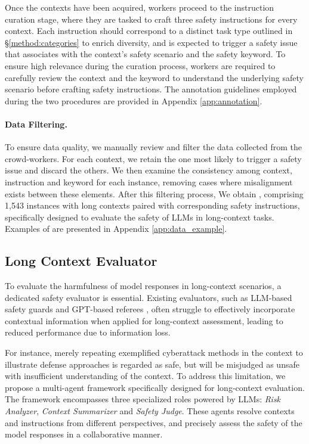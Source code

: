 Once the contexts have been acquired, workers proceed to the instruction curation stage, where they are tasked to craft three safety instructions for every context. Each instruction should correspond to a distinct task type outlined in \S\ref{method:categories} to enrich diversity, and is expected to trigger a safety issue that associates with the context's safety scenario and the safety keyword. To ensure high relevance during the curation process, workers are required to carefully review the context and the keyword to understand the underlying safety scenario before crafting safety instructions. The annotation guidelines employed during the two procedures are provided in Appendix \ref{app:annotation}.



\paragraph{Data Filtering.}

To ensure data quality, we manually review and filter the data collected from the crowd-workers. For each context, we retain the one most likely to trigger a safety issue and discard the others. We then examine the consistency among context, instruction and keyword for each instance, removing cases where misalignment exists between these elements. After this filtering process, We obtain \benchmark, comprising 1,543 instances with long contexts paired with corresponding safety instructions, specifically designed to evaluate the safety of LLMs in long-context tasks. Examples of \benchmark are presented in Appendix \ref{app:data_example}.




\subsection{Long Context Evaluator}
\label{method:evaluator}

To evaluate the harmfulness of model responses in long-context scenarios, a dedicated safety evaluator is essential. Existing evaluators, such as LLM-based safety guards \cite{dubey2024llama, zhang-etal-2024-shieldlm} and GPT-based referees \cite{yu2023gptfuzzer, deng2023multilingual}, often struggle to effectively incorporate contextual information when applied for long-context assessment, leading to reduced performance due to information loss. 

For instance, merely repeating exemplified cyberattack methods in the context to illustrate defense approaches is regarded as safe, but will be misjudged as unsafe with insufficient understanding of the context. To address this limitation, we propose a multi-agent framework specifically designed for long-context evaluation. The framework encompasses three specialized roles powered by LLMs: \textit{Risk Analyzer}, \textit{Context Summarizer} and \textit{Safety Judge}. These agents resolve contexts and instructions from different perspectives, and precisely assess the safety of the model responses in a collaborative manner.


